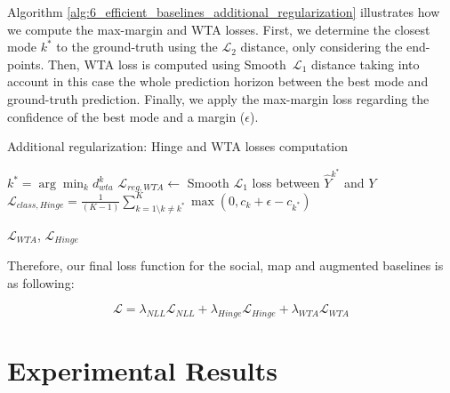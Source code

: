Algorithm \ref{alg:6_efficient_baselines_additional_regularization} illustrates how we compute the max-margin and \ac{WTA} losses. First, we determine the closest mode $k^{*}$ to the ground-truth using the $\mathcal{L}_2$ distance, only considering the end-points. Then, \ac{WTA} loss is computed using Smooth~$\mathcal{L}_1$ distance taking into account in this case the whole prediction horizon between the best mode and ground-truth prediction. Finally, we apply the max-margin loss regarding the confidence of the best mode and a margin ($\epsilon$).

\begin{algorithm}[H]
	\SetAlgoLined
	\caption{Additional regularization: Hinge and \ac{WTA} losses computation}
	\label{alg:6_efficient_baselines_additional_regularization}
	
	
	
	
	
	$k^* = \arg\min_{k} d_{wta}^{k}$\;
	$\mathcal{L}_{reg,WTA} \gets $ Smooth $\mathcal{L}_1$ loss between $\hat{Y}^{k^*}$ and $Y$\;
	$\mathcal{L}_{class,Hinge} = \frac{1}{(K-1)}\sum_{k=1 \setminus k \neq k^*}^{K} \max( 0, c_{k} + \epsilon - c_{k^*})$\;
	
	\Return $\mathcal{L}_{WTA}$, $\mathcal{L}_{Hinge}$\;
	
\end{algorithm}

Therefore, our final loss function for the social, map and augmented baselines is as following:

\begin{equation}
	\mathcal{L} = \lambda_{NLL} \mathcal{L}_{NLL} + \lambda_{Hinge} \mathcal{L}_{Hinge} + \lambda_{WTA} \mathcal{L}_{WTA}
	\label{eq:loss}
\end{equation}

\section{Experimental Results}
\label{sec:6_experimental_results}

